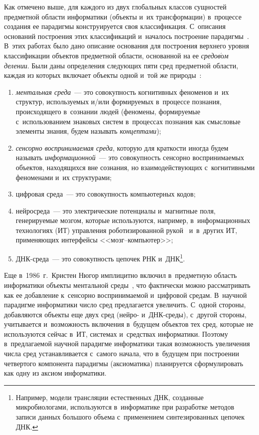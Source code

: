 \begin{multicols}{2}
  Как отмечено выше, для каждого из двух глобальных классов сущностей 
предметной области информатики (объекты и~их трансформации) в~процессе 
создания ее парадигмы конструируется своя классификация. С~описания 
оснований построения этих классификаций и~началось по\-стро\-ение 
парадигмы~\cite{25-zac, 26-zac}. В~этих работах было дано описание 
основания для по\-стро\-ения верх\-не\-го уровня классификации объектов 
пред\-мет\-ной об\-ласти, основанной на ее \textit{средов$\acute{\mbox{о}}$м 
делении}. Были даны определения сле\-ду\-ющих пяти сред пред\-мет\-ной об\-ласти, 
каж\-дая из которых включает объекты одной и~той же  
природы~\cite{25-zac, 26-zac}:
  \begin{enumerate}[(1)]
\item  \textit{ментальная среда}~--- это совокупность когнитивных феноменов и~их структур, ис\-поль\-зу\-емых и/или фор\-ми\-ру\-емых в~процессе по\-зна\-ния, 
происходящего в~сознании людей (феномены, фор\-ми\-ру\-емые с~использованием 
знаковых сис\-тем в~процессах по\-зна\-ния как смыс\-ло\-вые элементы знания, будем 
называть \mbox{\textit{концептами}});
\item \textit{сенсорно воспринимаемая среда}, которую для краткости иногда 
будем называть \textit{информационной}~--- это совокупность сенсорно 
воспринимаемых объектов, находящихся вне сознания, но взаимодействующих с~когнитивными феноменами и~их структурами;
\item  цифровая среда~--- это совокупность компьютерных кодов;
\item нейросреда~--- это электрические потенциалы и~магнитные поля, 
генерируемые мозгом, которые используются, например, в~информационных 
технологиях (ИТ) управ\-ле\-ния роботизированной рукой~\cite{27-zac} 
и~в~других ИТ, применяющих интерфейсы <<мозг--компь\-ютер>>;
\item ДНК-среда~--- это совокупность цепочек РНК и~ДНК\footnote{Например, 
модели трансляции естественных ДНК, созданные микробиологами, используются в~информатике 
при разработке методов записи данных большого объема с~применением синтезированных цепочек 
ДНК.}.
\end{enumerate}

    Еще в~1986~г.\ Кристен Нюгор имплицитно включил в~предметную 
область информатики объекты ментальной среды~\cite{3-zac}, что фактически 
можно рассматривать как ее добавление к~сенсорно воспринимаемой 
и~цифровой средам. В~научной парадигме информатики число сред 
предлагается увеличить. С~одной стороны, добавляются объекты еще двух сред 
(нейро- и~ДНК-сре\-ды), с~другой стороны, учитывается и~возможность 
включения в~будущем объектов тех сред, которые не используются сейчас 
в~ИТ, системах и~средствах информатики. Поэтому в~предлагаемой научной 
парадигме информатики такая возможность увеличения числа сред 
устанавливается с~самого начала, что в~будущем при построении четвертого 
компонента парадигмы (аксиоматика) планируется сформулировать как одну из 
аксиом информатики.


\end{multicols}
